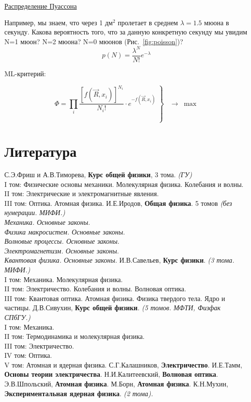 \underline{Распределение Пуассона}

Например, мы знаем, что через 1 дм$^2$ пролетает в среднем $\lambda=1.5$ мюона в секунду. Какова вероятность того, что за данную конкретную секунду мы увидим N=1 мюон? N=2 мюона? N=0 мюонов (Рис.~\ref{fig:poisson})? 
\begin{displaymath}
p(N)=\frac{\lambda^N}{N!}e^{-\lambda}
\end{displaymath}


ML-критерий:

\begin{displaymath}
\Phi =\left.\prod_i\frac{\left[f(\overrightarrow{R},x_i)\right]^{N_i}}{N_i!}\cdot e^{-f(\overrightarrow{R},x_i)}\;\right\}\;\;\;\rightarrow\;\max
\end{displaymath}

\section{Литература}
\sf\Large
\renewcommand{\bibname}{}
\begin{thebibliography}{99}
С.Э.Фриш и А.В.Тиморева, {\bf Курс общей физики}, 3 тома. {\sl\large (ГУ)}\\
{\large
I том: Физические основы механики. Молекулярная физика. Колебания и волны.\\
II том: Электрические и электромагнитные явления.\\
III том: Оптика. Атомная физика.
}
И.Е.Иродов, {\bf Общая физика}. 5 томов {\sl\large (без нумерации. МИФИ.)}\\
{\large
{\sl Механика. Основные законы}.\\
{\sl Физика макросистем. Основные законы}.\\
{\sl Волновые процессы. Основные законы}.\\
{\sl Электромагнетизм. Основные законы}.\\
{\sl Квантовая физика. Основные законы}.
}
И.В.Савельев, {\bf Курс физики}. {\sl\large (3 тома. МИФИ.)}\\
{\large
I том: Механика. Молекулярная физика. \\
II том: Электричество. Колебания и волны. Волновая оптика.\\
III том: Квантовая оптика. Атомная физика. Физика твердого тела. Ядро и частицы.
}
Д.В.Сивухин, {\bf Курс общей физики}.  {\sl\large (5 томов. МФТИ, Физфак СПбГУ.)}\\
{\large
I том: Механика.\\
II том: Термодинамика и молекулярная физика. \\
III том: Электричество. \\
IV том: Оптика.\\
V том: Атомная и ядерная физика.
}
С.Г.Калашников, {\bf Электричество}.
И.Е.Тамм, {\bf Основы теории электричества}.
Н.И.Калитеевский, {\bf Волновая оптика}.
Э.В.Шпольский, {\bf Атомная физика}.
М.Борн, {\bf Атомная физика}.
К.Н.Мухин,  {\bf Экспериментальная ядерная физика}. {\sl\large (2 тома).}
\end{thebibliography}


